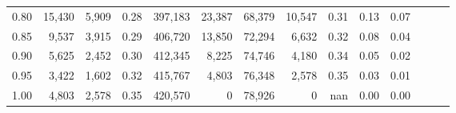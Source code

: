 \begin{tabular}{rrrrrrrrrrrrrr}
0.80 &  15,430 &  5,909 &  0.28 &  397,183 &   23,387 &  68,379 &  10,547 &  0.31 &  0.13 &      0.07 \\
0.85 &   9,537 &  3,915 &  0.29 &  406,720 &   13,850 &  72,294 &   6,632 &  0.32 &  0.08 &      0.04 \\
0.90 &   5,625 &  2,452 &  0.30 &  412,345 &    8,225 &  74,746 &   4,180 &  0.34 &  0.05 &      0.02 \\
0.95 &   3,422 &  1,602 &  0.32 &  415,767 &    4,803 &  76,348 &   2,578 &  0.35 &  0.03 &      0.01 \\
1.00 &   4,803 &  2,578 &  0.35 &  420,570 &        0 &  78,926 &       0 &   nan &  0.00 &      0.00 \\
\bottomrule
\end{tabular}
